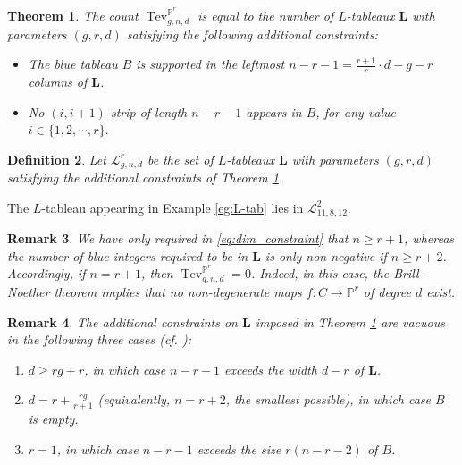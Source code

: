 \documentclass[12pt]{amsart}
\def\bP{\mathbb{P}}
\def\cL{\mathcal{L}}
\def\bL{\mathbf{L}}
\DeclareMathOperator{\Tev}{Tev}
\newtheorem{definition}{Definition}[section]
\newtheorem{theorem}[definition]{Theorem}
\newtheorem{remark}[definition]{Remark}
\begin{document}
\begin{theorem}{\cite[Theorem 7.9]{tev_Pr}}
\label{carlthm} The count $\Tev^{\bP^r}_{g,n,d}$ is equal to the number of $L$-tableaux $\bL$ with parameters $(g,r,d)$ satisfying the following additional constraints:

\begin{itemize}
    \item The blue tableau $B$ is supported in the leftmost $n-r-1=\frac{r+1}{r}\cdot d-g-r$ columns of $\bL$.
    \item No $(i,i+1)$-strip of length $n-r-1$ appears in $B$, for any value $i\in \{1,2,\cdots, r\}.$
\end{itemize}
\end{theorem}

\begin{definition}\label{def:calL}
    Let $\cL_{g,n,d}^r$ be the set of $L$-tableaux $\bL$ with parameters $(g,r,d)$ satisfying the additional constraints of Theorem \ref{carlthm}.
\end{definition}

The $L$-tableau appearing in Example \ref{eg:L-tab} lies in $\cL_{11,8,12}^2$.

\begin{remark}
We have only required in \eqref{eq:dim_constraint} that $n\ge r+1$, whereas the number of blue integers required to be in $\bL$ is only non-negative if $n\ge r+2$. Accordingly, if $n=r+1$, then $\Tev^{\bP^r}_{g,n,d}=0$. Indeed, in this case, the Brill-Noether theorem implies that no non-degenerate maps $f:C\to\bP^r$ of degree $d$ exist.
\end{remark}

\begin{remark}\label{rem:conditions_vacuous}
The additional constraints on $\bL$ imposed in Theorem \ref{carlthm} are vacuous in the following three cases (cf. \cite[Theorem 1.3]{fl}):
\begin{enumerate}
    \item[(a)] $d\ge rg+r$, in which case $n-r-1$ exceeds the width $d-r$ of $\bL$.
    \item[(b)] $d=r+\frac{rg}{r+1}$ (equivalently, $n=r+2$, the smallest possible), in which case $B$ is empty.
    \item[(c)] $r=1$, in which case $n-r-1$ exceeds the size $r(n-r-2)$ of $B$.
\end{enumerate}
\end{remark}
\end{document}
